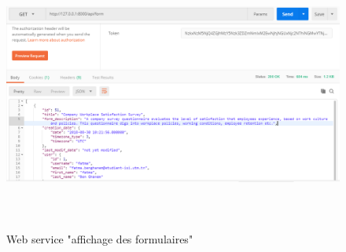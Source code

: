     \begin{figure} [H]
    \centering
         \begin{center}
             \includegraphics [width=16cm,height=9cm] {SprintImage/GetForms.PNG}
            \caption{Web service "affichage des formulaires"}
            \label{SerWeb2}
        \end{center}
    \end{figure}
    
